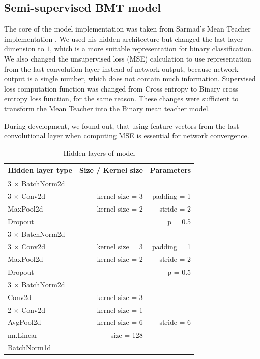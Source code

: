 \subsection{Semi-supervised BMT model}
The core of the model implementation was taken from Sarmad's Mean Teacher implementation \cite{sarmad-repo}. We used his hidden architecture but changed the last layer dimension to $1$, which is a more suitable representation for binary classification. We also changed the unsupervised loss (MSE) calculation to use representation from the last convolution layer instead of network output, because network output is a single number, which does not contain much information. Supervised loss computation function was changed from Cross entropy to Binary cross entropy loss function, for the same reason. These changes were sufficient to transform the Mean Teacher into the Binary mean teacher model. 

During development, we found out, that using feature vectors from the last convolutional layer when computing MSE is essential for network convergence. 

\bigskip

\begin{table}[ht]
    \centering
    \begin{tabular}{ |l|r|r|} 
     \hline
            Hidden layer type & Size / Kernel size & Parameters\\
            \hline
            3 $\times$ BatchNorm2d &  & \\
            \hline
            3 $\times$ Conv2d & kernel size = 3 & padding = 1 \\
            \hline
            MaxPool2d & kernel size = 2 & stride = 2\\
            \hline
            Dropout & & p = 0.5\\
            \hline
            3 $\times$ BatchNorm2d &  &\\
            \hline
            3 $\times$ Conv2d & kernel size = 3 & padding = 1 \\
            \hline
            MaxPool2d & kernel size = 2 & stride = 2\\
            \hline
            Dropout & & p = 0.5\\
            \hline
            3 $\times$ BatchNorm2d &  & \\
            \hline
            Conv2d & kernel size = 3 & \\
            \hline
            2 $\times$ Conv2d & kernel size = 1 & \\
            \hline
            AvgPool2d & kernel size = 6 & stride = 6\\
            \hline
            nn.Linear & size = 128 &\\
            \hline
            BatchNorm1d & & \\
     \hline
    \end{tabular}
    \caption{Hidden layers of model}
    \label{layers}
\end{table}


